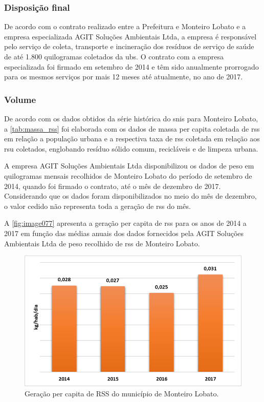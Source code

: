 	\subsubsection{Disposição final}
	
	De acordo com o contrato realizado entre a Prefeitura e Monteiro Lobato e a empresa especializada AGIT Soluções Ambientais Ltda, a empresa é responsável pelo serviço de coleta, transporte e incineração dos resíduos de serviço de saúde de até 1.800 quilogramas coletados da \acrshort{ubs}.
	O contrato com a empresa especializada foi firmado em setembro de 2014 e têm sido anualmente prorrogado para os mesmos serviços por mais 12 meses até atualmente, no ano de 2017.
	
	\subsubsection{Volume}
	De acordo com os dados obtidos da série histórica do \gls{snis} para Monteiro Lobato, a \autoref{tab:massa_rss} foi elaborada com os dados de massa per capita coletada de \gls{rss} em relação a população urbana e a respectiva taxa de \gls{rss} coletada em relação aos \gls{rsu} coletados, englobando resíduo sólido comum, recicláveis e de limpeza urbana.
	
	
	
	A empresa AGIT Soluções Ambientais Ltda disponibilizou os dados de peso em quilogramas mensais recolhidos de Monteiro Lobato do período de setembro de 2014, quando foi firmado o contrato, até o mês de dezembro de 2017. Considerando que os dados foram disponibilizados no meio do mês de dezembro, o valor cedido não representa toda a geração de \gls{rss} do mês.
	
	A \autoref{fig:image077} apresenta a geração per capita de \gls{rss} para os anos de 2014 a 2017 em função das médias anuais dos dados fornecidos pela AGIT Soluções Ambientais Ltda de peso recolhido de \gls{rss} de Monteiro Lobato.
	
	\begin{figure}
		\centering
		\includegraphics[width=0.75\linewidth]{produtos/prodtres/image077}
		\caption{Geração per capita de RSS do município de Monteiro Lobato.}
		\label{fig:image077}
	\end{figure}
	
